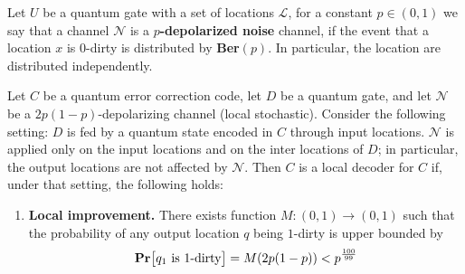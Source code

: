 \begin{definition}
  Let $U$ be a quantum gate with a set of locations $\mathcal{L}$, for a constant $p\in(0,1)$ we say that a channel $\mathcal{N}$ is a \textbf{$p$-depolarized noise} channel, if the event that a location $x$ is $0$-dirty is distributed by \textbf{Ber}$(p)$. In particular, the location are distributed independently.   
\end{definition}


\begin{definition} 
  \label{def:locald}
Let $C$ be a quantum error correction code, let $D$ be a quantum gate, and let $\mathcal{N}$ be a $2p(1-p)$-depolarizing channel (local stochastic). Consider the following setting: $D$ is fed by a quantum state encoded in $C$ through input locations. $\mathcal{N}$ is applied only on the input locations and on the inter locations of $D$; in particular, the output locations are not affected by $\mathcal{N}$. Then $C$ is a local decoder for $C$ if, under that setting, the following holds:
  \begin{enumerate}
    \item \textbf{Local improvement.} There exists function $M : (0,1) \rightarrow (0,1) $ such that the probability of any output location  $q$ being $1$-dirty is upper bounded by 
      \begin{equation*}
        \begin{split}
          \mathbf{Pr} \big[  q_{1} \text{ is } 1 \text{-dirty}  \big] =  M(2p(1-p)) < p^{\frac{100}{99}}
        \end{split}
      \end{equation*}


\end{enumerate}
\end{definition}
